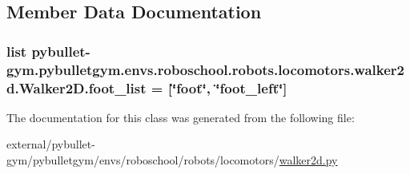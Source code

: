 \subsection{Member Data Documentation}
\subsubsection[{\texorpdfstring{foot\+\_\+list}{foot_list}}]{\setlength{\rightskip}{0pt plus 5cm}list pybullet-\/gym.\+pybulletgym.\+envs.\+roboschool.\+robots.\+locomotors.\+walker2d.\+Walker2\+D.\+foot\+\_\+list = \mbox{[}\char`\"{}foot\char`\"{}, \char`\"{}foot\+\_\+left\char`\"{}\mbox{]}\hspace{0.3cm}{\ttfamily [static]}}\hypertarget{classpybullet-gym_1_1pybulletgym_1_1envs_1_1roboschool_1_1robots_1_1locomotors_1_1walker2d_1_1_walker2_d_a2523095aec75940b1c6bbfc74cbf571c}{}\label{classpybullet-gym_1_1pybulletgym_1_1envs_1_1roboschool_1_1robots_1_1locomotors_1_1walker2d_1_1_walker2_d_a2523095aec75940b1c6bbfc74cbf571c}


The documentation for this class was generated from the following file\+:\begin{DoxyCompactItemize}
\item 
external/pybullet-\/gym/pybulletgym/envs/roboschool/robots/locomotors/\hyperlink{roboschool_2robots_2locomotors_2walker2d_8py}{walker2d.\+py}\end{DoxyCompactItemize}
